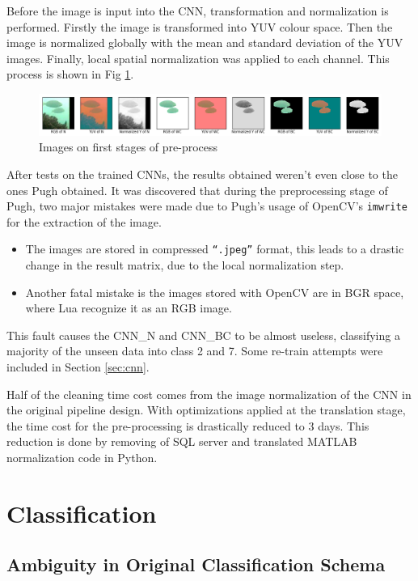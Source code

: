 \documentclass[bsc,logo,twoside,fullspacing,parskip]{infthesis}
\begin{document}
Before the image is input into the CNN, transformation and normalization is performed. 
Firstly the image is transformed into YUV colour space.
Then the image is normalized globally with the mean and standard deviation of the YUV images.
Finally, local spatial normalization was applied to each channel.
This process is shown in Fig \ref{fig:imageprepro}.

\begin{figure}[ht]
\centering
    \includegraphics[scale=0.4]{graph/imagepre.png}
    \caption{Images on first stages of pre-process}
    \label{fig:imageprepro}
\end{figure}

After tests on the trained CNNs, the results obtained weren't even close to the ones Pugh obtained.
It was discovered that during the preprocessing stage of Pugh, two major mistakes were made due to Pugh's usage of OpenCV's {\tt imwrite} for the extraction of the image.

\begin{itemize}
\setlength{\parskip}{1pt}
\item
The images are stored in compressed {\tt ``.jpeg''} format, this leads to a drastic change in the result matrix, due to the local normalization step. 
\item
Another fatal mistake is the images stored with OpenCV are in BGR space, where Lua recognize it as an RGB image.
\end{itemize}
This fault causes the CNN\_N and CNN\_BC to be almost useless, classifying a majority of the unseen data into class 2 and 7. Some re-train attempts were included in Section \ref{sec:cnn}.

Half of the cleaning time cost comes from the image normalization of the CNN in the original pipeline design.
With optimizations applied at the translation stage, the time cost for the pre-processing is drastically reduced to 3 days. 
This reduction is done by removing of SQL server and translated MATLAB normalization code in Python.

\chapter{Classification}
\label{chap:classify}

\section{Ambiguity in Original Classification Schema}
\label{sec:AmbigCS}
\end{document}
